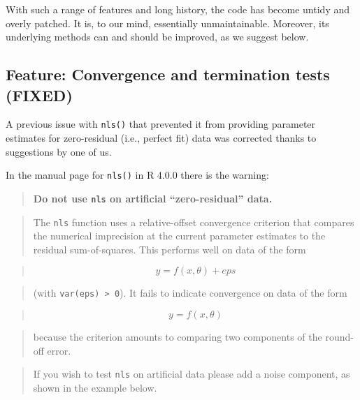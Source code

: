 \documentclass[
]{article}
\begin{document}
With such a range of features and long history, the code has become
untidy and overly patched. It is, to our mind, essentially
unmaintainable. Moreover, its underlying methods can and should be
improved, as we suggest below.

\hypertarget{feature-convergence-and-termination-tests-fixed}{%
\subsection{Feature: Convergence and termination tests
(FIXED)}\label{feature-convergence-and-termination-tests-fixed}}

A previous issue with \texttt{nls()} that prevented it from providing
parameter estimates for zero-residual (i.e., perfect fit) data was
corrected thanks to suggestions by one of us.

In the manual page for \texttt{nls()} in R 4.0.0 there is the warning:

\begin{quote}
\textbf{Do not use \texttt{nls} on artificial ``zero-residual'' data.}
\end{quote}

\begin{quote}
The \texttt{nls} function uses a relative-offset convergence criterion
that compares the numerical imprecision at the current parameter
estimates to the residual sum-of-squares. This performs well on data of
the form
\end{quote}

\begin{quote}
\[  y = f(x, \theta) + eps \]
\end{quote}

\begin{quote}
(with \texttt{var(eps)\ \textgreater{}\ 0}). It fails to indicate
convergence on data of the form
\end{quote}

\begin{quote}
\[  y = f(x, \theta)  \]
\end{quote}

\begin{quote}
because the criterion amounts to comparing two components of the
round-off error.
\end{quote}

\begin{quote}
If you wish to test \texttt{nls} on artificial data please add a noise
component, as shown in the example below.
\end{quote}
\end{document}
